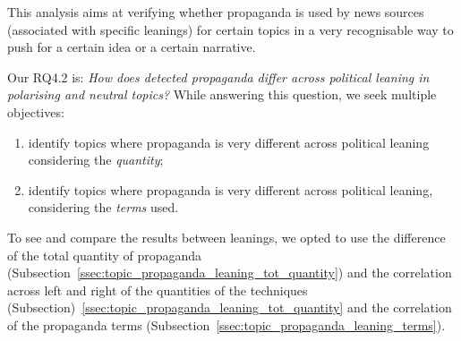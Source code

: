 This analysis aims at verifying whether propaganda is used by news sources (associated with specific leanings) for certain topics in a very recognisable way to push for a certain idea or a certain narrative.

Our RQ4.2 is: \emph{How does detected propaganda differ across political leaning in polarising and neutral topics?}
While answering this question, we seek multiple objectives:

\begin{enumerate}
    \item identify topics where propaganda is very different across political leaning considering the \emph{quantity};
    \item identify topics where propaganda is very different across political leaning, considering the \emph{terms} used.
\end{enumerate}

To see and compare the results between leanings, we opted to use the difference of the total quantity of propaganda (Subsection~\ref{ssec:topic_propaganda_leaning_tot_quantity}) and the correlation across left and right of the quantities of the techniques (Subsection)~\ref{ssec:topic_propaganda_leaning_tot_quantity} and the correlation of the propaganda terms (Subsection~\ref{ssec:topic_propaganda_leaning_terms}). 








